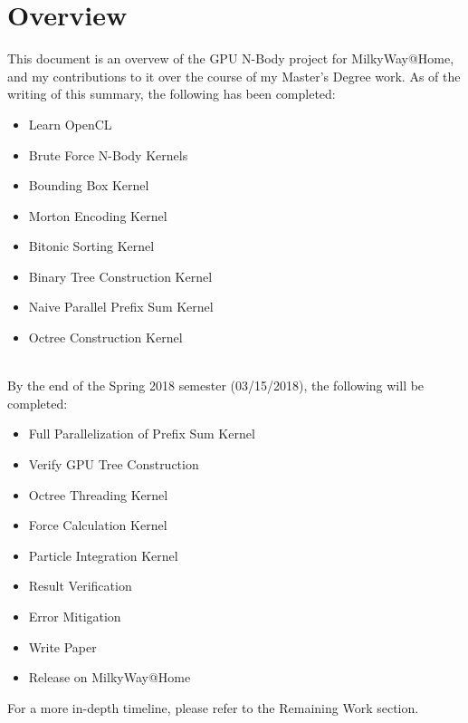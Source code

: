 \documentclass[fleqn,10pt]{SelfArx} %
\begin{document}
\flushbottom %

\maketitle %

\tableofcontents %

\thispagestyle{empty} %


\section*{Overview}
This document is an overvew of the GPU N-Body project for MilkyWay@Home, and my contributions to it over the course of my Master's Degree work. As of the writing of this summary, the following has been completed:
\begin{itemize}
    \setlength\itemsep{0.1pt}
    \item Learn OpenCL
    \item Brute Force N-Body Kernels
    \item Bounding Box Kernel
    \item Morton Encoding Kernel
    \item Bitonic Sorting Kernel
    \item Binary Tree Construction Kernel
    \item Naive Parallel Prefix Sum Kernel
    \item Octree Construction Kernel
\end{itemize}
~\\

By the end of the Spring 2018 semester (03/15/2018), the following will be completed:
\begin{itemize}
    \setlength\itemsep{0.1pt}
    \item Full Parallelization of Prefix Sum Kernel
    \item Verify GPU Tree Construction
    \item Octree Threading Kernel
    \item Force Calculation Kernel
    \item Particle Integration Kernel
    \item Result Verification
    \item Error Mitigation
    \item Write Paper
    \item Release on MilkyWay@Home
\end{itemize}
For a more in-depth timeline, please refer to the Remaining Work section.
\end{document}
